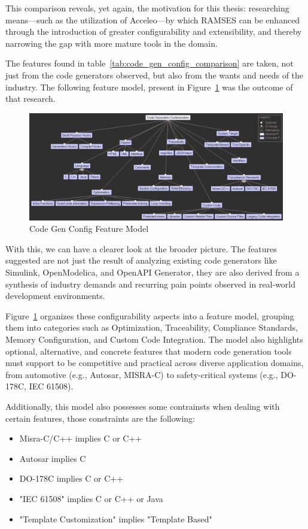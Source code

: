 This comparison reveals, yet again, the motivation for this thesis: researching means—such as the utilization of Acceleo—by which RAMSES can be enhanced through the introduction of greater configurability and extensibility, and thereby narrowing the gap with more mature tools in the domain.

The features found in table~\ref{tab:code_gen_config_comparison} are taken, not just from the code generators observed, but also from the wants and needs of the industry. The following feature model, present in Figure~\ref{fig:feature_model} was the outcome of that research.

\begin{figure}[htbp]
	\centering
	\includegraphics[height=0.4\textwidth]{featureModel.png}
	\caption{Code Gen Config Feature Model}
	\label{fig:feature_model}
\end{figure}

With this, we can have a clearer look at the broader picture. The features suggested are not just the result of analyzing existing code generators like Simulink, OpenModelica, and OpenAPI Generator, they are also derived from a synthesis of industry demands and recurring pain points observed in real-world development environments.

Figure~\ref{fig:feature_model} organizes these configurability aspects into a feature model, grouping them into categories such as Optimization, Traceability, Compliance Standards, Memory Configuration, and Custom Code Integration. The model also highlights optional, alternative, and concrete features that modern code generation tools must support to be competitive and practical across diverse application domains, from automotive (e.g., Autosar, MISRA-C) to safety-critical systems (e.g., DO-178C, IEC 61508).

Additionally, this model also possesses some contrainsts when dealing with certain features, those constraints are the following:

\begin{itemize} 
	\item Misra-C/C++ implies C or C++
	\item Autosar implies C
	\item DO-178C implies C or C++
	\item "IEC 61508" implies C or C++ or Java
	\item "Template Customization" implies "Template Based"
\end{itemize}


